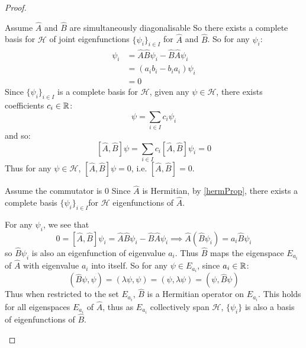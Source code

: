 \documentclass[../main.tex]{subfiles}
\begin{document}
\begin{proof}
  \begin{proofdirection}{Assume $\hat{A}$ and $\hat{B}$ are simultaneously diagonalisable}
    So there exists a complete basis for $\mathcal{H}$ of joint eigenfunctions $\{\psi_i\}_{i \in I}$ for $\hat{A}$ and $\hat{B}$.
    So for any $\psi_i$:
    \begin{align*}
      [\hat{A}, \hat{B}]\psi_i &= \hat{A}\hat{B} \psi_i - \hat{B}\hat{A}\psi_i \\
                               &= (a_i b_i - b_i a_i) \psi_i \\
                               &= 0
    \end{align*}
    Since $\{\psi_i\}_{i \in I}$ is a complete basis for $\mathcal{H}$, given any $\psi \in \mathcal{H}$, there exists coefficients $c_i \in \mathbb{R}$:
    \[
      \psi = \sum_{i \in I} c_i \psi_i
    \]
    and so:
    \[
      [\hat{A}, \hat{B}] \psi = \sum_{i \in I} c_i [\hat{A}, \hat{B}] \psi_i = 0
    \]
    Thus for any $\psi \in \mathcal{H}$, $[\hat{A}, \hat{B}]\psi = 0$, i.e. $[\hat{A}, \hat{B}] = 0$.
  \end{proofdirection}
  \begin{proofdirection}{Assume the commutator is 0}
    Since $\hat{A}$ is Hermitian, by \cref{hermProp}, there exists a complete basis $\{\psi_i\}_{i \in I}$for $\mathcal{H}$ eigenfunctions of $\hat{A}$.

    For any $\psi_i$, we see that
    \[
      0 = [\hat{A}, \hat{B}] \psi_i = \hat{A} \hat{B} \psi_i - \hat{B} \hat{A} \psi_i \implies \hat{A}(\hat{B} \psi_i) = a_i \hat{B} \psi_i
    \]
    so $\hat{B} \psi_i$ is also an eigenfunction of eigenvalue $a_i$.
    Thus $\hat{B}$ maps the eigenspace $E_{a_i}$ of $\hat{A}$ with eigenvalue $a_i$ into itself.
    So for any $\psi \in E_{a_i}$, since $a_i \in \mathbb{R}$:
    \[
      (\hat{B}\psi, \psi) = (\lambda \psi, \psi) = (\psi, \lambda \psi) = (\psi, \hat{B}\psi)
    \]
    Thus when restricted to the set $E_{a_i}$, $\hat{B}$ is a Hermitian operator on $E_{a_i}$.
    This holds for all eigenspaces $E_{a_i}$ of $\hat{A}$, thus as $E_{a_i}$ collectively span $\mathcal{H}$, $\{\psi_i\}$ is also a basis of eigenfunctions of $\hat{B}$.
  \end{proofdirection}
\end{proof}
\end{document}
